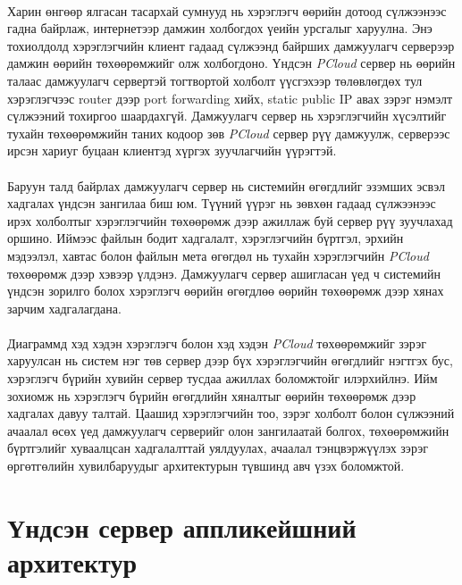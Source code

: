 \paragraph{}
Харин өнгөөр ялгасан тасархай сумнууд нь хэрэглэгч өөрийн дотоод сүлжээнээс гадна байрлаж, интернетээр дамжин холбогдох үеийн урсгалыг харуулна. Энэ тохиолдолд хэрэглэгчийн клиент гадаад сүлжээнд байрших дамжуулагч серверээр дамжин өөрийн төхөөрөмжийг олж холбогдоно. Үндсэн \textit{PCloud} сервер нь өөрийн талаас дамжуулагч сервертэй тогтвортой холболт үүсгэхээр төлөвлөгдөх тул хэрэглэгчээс router дээр port forwarding хийх, static public IP авах зэрэг нэмэлт сүлжээний тохиргоо шаардахгүй. Дамжуулагч сервер нь хэрэглэгчийн хүсэлтийг тухайн төхөөрөмжийн таних кодоор зөв \textit{PCloud} сервер рүү дамжуулж, серверээс ирсэн хариуг буцаан клиентэд хүргэх зуучлагчийн үүрэгтэй.

\paragraph{}
Баруун талд байрлах дамжуулагч сервер нь системийн өгөгдлийг эзэмших эсвэл хадгалах үндсэн зангилаа биш юм. Түүний үүрэг нь зөвхөн гадаад сүлжээнээс ирэх холболтыг хэрэглэгчийн төхөөрөмж дээр ажиллаж буй сервер рүү зуучлахад оршино. Иймээс файлын бодит хадгалалт, хэрэглэгчийн бүртгэл, эрхийн мэдээлэл, хавтас болон файлын мета өгөгдөл нь тухайн хэрэглэгчийн \textit{PCloud} төхөөрөмж дээр хэвээр үлдэнэ. Дамжуулагч сервер ашигласан үед ч системийн үндсэн зорилго болох хэрэглэгч өөрийн өгөгдлөө өөрийн төхөөрөмж дээр хянах зарчим хадгалагдана.

\paragraph{}
Диаграммд хэд хэдэн хэрэглэгч болон хэд хэдэн \textit{PCloud} төхөөрөмжийг зэрэг харуулсан нь систем нэг төв сервер дээр бүх хэрэглэгчийн өгөгдлийг нэгтгэх бус, хэрэглэгч бүрийн хувийн сервер тусдаа ажиллах боломжтойг илэрхийлнэ. Ийм зохиомж нь хэрэглэгч бүрийн өгөгдлийн хяналтыг өөрийн төхөөрөмж дээр хадгалах давуу талтай. Цаашид хэрэглэгчийн тоо, зэрэг холболт болон сүлжээний ачаалал өсөх үед дамжуулагч серверийг олон зангилаатай болгох, төхөөрөмжийн бүртгэлийг хуваалцсан хадгалалттай уялдуулах, ачаалал тэнцвэржүүлэх зэрэг өргөтгөлийн хувилбаруудыг архитектурын түвшинд авч үзэх боломжтой.

\section{Үндсэн сервер аппликейшний архитектур}
